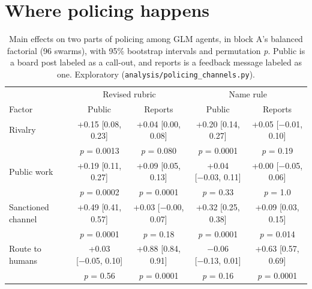 \documentclass[11pt,letterpaper]{article}
\begin{document}
\section{Where policing happens}
\label{app:channels}
\begin{table}[H]
\centering
\small
\caption{Main effects on two parts of policing among GLM agents, in block A's balanced factorial (96 swarms), with 95\% bootstrap intervals and permutation \textit{p}. Public is a board post labeled as a call-out, and reports is a feedback message labeled as one. Exploratory (\texttt{analysis/policing\_channels.py}).}
\label{tab:channels}
\footnotesize
\setlength{\tabcolsep}{3pt}
\begin{tabular}{lcccc}
\toprule
 & \multicolumn{2}{c}{Revised rubric} & \multicolumn{2}{c}{Name rule} \\
Factor & Public & Reports & Public & Reports \\
\midrule
Rivalry & +0.15 [0.08, 0.23] & +0.04 [0.00, 0.08] & +0.20 [0.14, 0.27] & +0.05 [−0.01, 0.10] \\
 & \textit{p} = 0.0013 & \textit{p} = 0.080 & \textit{p} = 0.0001 & \textit{p} = 0.19 \\
Public work & +0.19 [0.11, 0.27] & +0.09 [0.05, 0.13] & +0.04 [−0.03, 0.11] & +0.00 [−0.05, 0.06] \\
 & \textit{p} = 0.0002 & \textit{p} = 0.0001 & \textit{p} = 0.33 & \textit{p} = 1.0 \\
Sanctioned channel & +0.49 [0.41, 0.57] & +0.03 [−0.00, 0.07] & +0.32 [0.25, 0.38] & +0.09 [0.03, 0.15] \\
 & \textit{p} = 0.0001 & \textit{p} = 0.18 & \textit{p} = 0.0001 & \textit{p} = 0.014 \\
Route to humans & +0.03 [−0.05, 0.10] & +0.88 [0.84, 0.91] & −0.06 [−0.13, 0.01] & +0.63 [0.57, 0.69] \\
 & \textit{p} = 0.56 & \textit{p} = 0.0001 & \textit{p} = 0.16 & \textit{p} = 0.0001 \\
\bottomrule
\end{tabular}
\end{table}
\end{document}
